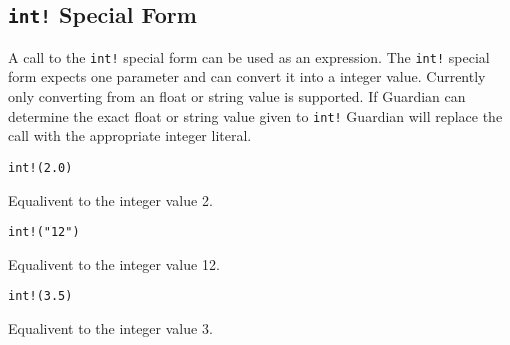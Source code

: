 
\subsection{\texttt{int!} Special Form}
{
	A call to the \texttt{int!} special form can be used as an expression.
	The \texttt{int!} special form expects one parameter and can convert it
	into a integer value. Currently only converting from an float or string
	value is supported.
	If Guardian can determine the exact float or string value given to
	\texttt{int!} Guardian will replace the call with the appropriate
	integer literal.
	
	\begin{itemize}
	{
		\item \texttt{int!(2.0)}
		
			Equalivent to the integer value 2.
		
		\item \texttt{int!("12")}
		
			Equalivent to the integer value 12.
		
		\item \texttt{int!(3.5)}
		
			Equalivent to the integer value 3.
	}
	\end{itemize}
}
